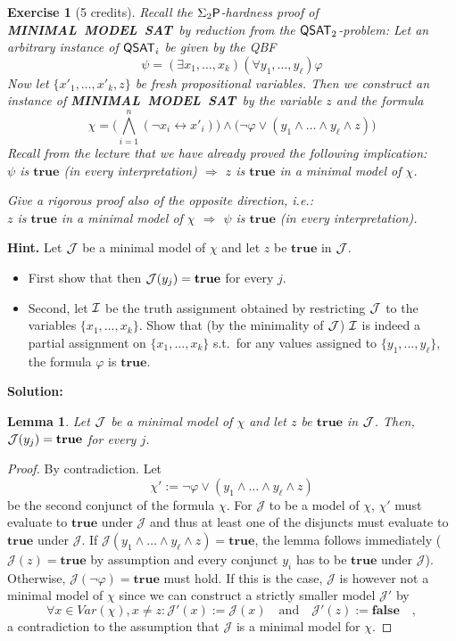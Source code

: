\documentclass [11pt]{article}
\newtheorem{lemma}[theorem]{Lemma}
\newtheorem{exercise}{Exercise}
\newcommand{\Ra}{\Rightarrow}
\renewcommand{\phi}{\varphi}
\newcommand{\ccfont}[1]{\protect\mathsf{#1}}
\newcommand{\Ptime}{\ccfont{P}}
\newcommand{\phs}[1]{\Sigma_{#1}\Ptime}
\newcommand{\QSAT}[1]{\ccfont{QSAT}_{#1}}
\newcommand{\MINSAT}{\mbox{\bf MINIMAL MODEL SAT}}
\newcommand{\True}{\mathbf{true}}
\newcommand{\False}{\mathbf{false}}
\newcommand{\mJ}{\ensuremath{\mathcal{J}}}
\newcommand{\mJp}{\ensuremath{\mathcal{J'}}}
\begin{document}
\noindent
\begin{exercise}[5 credits]
{\em Recall the $\phs{2}$-hardness proof of \MINSAT\ by reduction from the $\QSAT{2}$-problem: 
%
Let an arbitrary instance of $\QSAT{i}$ be given by the 
QBF
%
$$\psi = (\exists x_1, \dots, x_k) 
(\forall y_1, \dots, y_\ell) \phi
$$
%
%
Now let $\{x'_1, \dots, x'_k, z\}$ be fresh propositional variables.
Then we construct an instance of 
\MINSAT\ by the {\em variable $z$} and the {\em formula} 
%
$$\chi =  
\big(\bigwedge_{i=1}^n (\neg x_i \leftrightarrow x'_i) \big)
\wedge \big( \neg \phi \vee (y_1 \wedge \dots 
\wedge y_\ell \wedge z)\big)
$$
%
Recall from the lecture that we have already proved the following 
implication:  \\
$\psi$ is $\True$ (in every interpretation) $\Ra$ $z$ is $\True$ in a minimal model of $\chi$.


\smallskip
\noindent
Give a rigorous proof also of the opposite direction, i.e.: \\
$z$ is $\True$ in a minimal model of $\chi$ 
$\Ra$ $\psi$ is $\True$ (in every interpretation).
} %
\end{exercise}


\noindent
{\bf Hint.} Let ${\cal J}$ be 
a minimal model of $\chi$ and let 
$z$ be $\True$ in ${\cal J}$. 
\begin{itemize}
\item First show that then 
${\cal J} (y_j) = \True$ for every $j$.
\item
Second, let ${\cal I}$ be the truth assignment obtained by 
restricting ${\cal J}$ to the variables 
$\{x_1, \dots, x_k \}$. Show that (by the minimality of ${\cal J}$)
${\cal I}$ is indeed a 
partial assignment on $\{x_1, \dots, x_k\}$ s.t.\ for any values assigned to $\{y_1, \dots, y_\ell\}$, the formula $\phi$ is $\True$. 
\end{itemize}

\bigskip
\noindent
\textbf{Solution:}

\begin{lemma}
 Let ${\cal J}$ be a minimal model of $\chi$ and let $z$ be $\True$ in ${\cal J}$. Then, ${\cal J} (y_j) = \True$ for every $j$.
\end{lemma}
\begin{proof}
By contradiction. Let 
$$
\chi' := \neg \phi \vee (y_1 \wedge \dots \wedge y_\ell \wedge z)
$$
be the second conjunct of the formula $\chi$. For $\mJ$ to be a model of $\chi$, $\chi'$ must evaluate to $\True$ under $\mJ$ and thus at least one of the disjuncts must evaluate to $\True$ under $\mJ$. If $\mJ(y_1 \wedge \dots \wedge y_\ell \wedge z) = \True$, the lemma follows immediately ($\mJ(z) = \True$ by assumption and every conjunct $y_i$ has to be $\True$ under $\mJ$). Otherwise, $\mJ(\neg \phi) = \True$ must hold. If this is the case, $\mJ$ is however not a minimal model of $\chi$ since we can construct a strictly smaller model $\mJp$ by
$$
\forall x \in Var(\chi), x\neq z: \mJp(x) := \mJ(x) \quad \mathrm{and} \quad \mJp(z) := \False \quad ,
$$
a contradiction to the assumption that $\mJ$ is a minimal model for $\chi$.
\end{proof}
\end{document}

